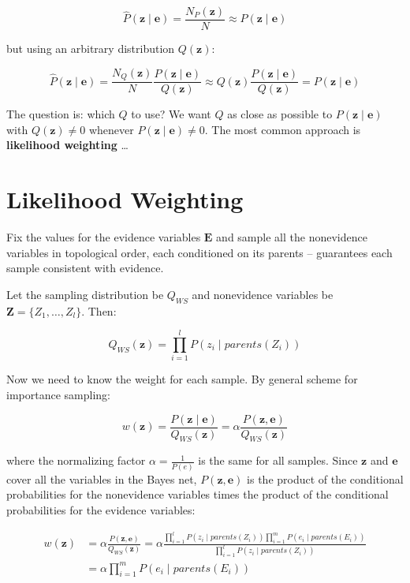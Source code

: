 \documentclass[11pt]{article}
\begin{document}
\vspace{-.1in}
\[
\hat{P} (\bm{z} \mid \bm{e}) = \frac{ N_P (\bm{z}) }{ N } \approx P(\bm{z} \mid \bm{e})
\]

but using an arbitrary distribution \(Q(\bm{z})\):

\[
\hat{P} (\bm{z} \mid \bm{e}) =
\frac{ N_Q (\bm{z}) }{ N } \frac{ P(\bm{z} \mid \bm{e}) }{ Q(\bm{z}) }  \approx
Q(\bm{z}) \frac{ P(\bm{z} \mid \bm{e}) }{ Q(\bm{z}) } =
P(\bm{z} \mid \bm{e})
\]

The question is: which \(Q\) to use?  We want \(Q\) as close as possible to \(P(\bm{z} \mid \bm{e})\) with \(Q(\bm{z}) \ne 0\) whenever \(P(\bm{z} \mid \bm{e}) \ne 0\).  The most common approach is \textbf{likelihood weighting} \ldots{}
\section{Likelihood Weighting}
\label{sec:org0c3042c}

Fix the values for the evidence variables \(\bm{E}\) and sample all the nonevidence variables in topological order, each conditioned on its parents -- guarantees each sample consistent with evidence.

Let the sampling distribution be \(Q_{WS}\) and nonevidence variables be \(\bm{Z} = \{ Z_1, \dots, Z_l \}\). Then:

\vspace{-.2in}
\[
Q_{WS}(\bm{z}) = \prod_{i = 1}^l P(z_i \mid parents(Z_i))
\]

Now we need to know the weight for each sample.  By general scheme for importance sampling:

\vspace{-.1in}
\[
w(\bm{z}) = \frac{ P(\bm{z}\mid \bm{e}) }{ Q_{WS}(\bm{z}) } = \alpha \frac{ P(\bm{z},\bm{e}) }{ Q_{WS}(\bm{z}) }
\]

where the normalizing factor \(\alpha = \frac{1}{P(e)}\) is the same for all samples.  Since \(\bm{z}\) and \(\bm{e}\) cover all the variables in the Bayes net, \(P(\bm{z}, \bm{e})\) is the product of the conditional probabilities for the nonevidence variables times the product of the conditional probabilities for the evidence variables:

\vspace{-.2in}
\begin{align*}
w(\bm{z}) &= \alpha \frac{ P(\bm{z},\bm{e}) }{ Q_{WS}(\bm{z}) }
          = \alpha \frac{ \prod_{i = 1}^l P(z_i \mid parents(Z_i)) \prod_{i = 1}^m P(e_i \mid parents(E_i))  }
          { \prod_{i = 1}^l P(z_i \mid parents(Z_i))  }\\
          &= \alpha \prod_{i = 1}^m P(e_i \mid parents(E_i)) \tag{14.9}
\end{align*}
\end{document}
